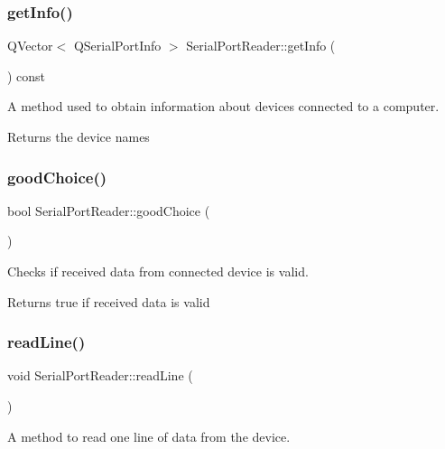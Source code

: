 \subsubsection{get\+Info()}
{\footnotesize\ttfamily Q\+Vector$<$ Q\+Serial\+Port\+Info $>$ Serial\+Port\+Reader\+::get\+Info (\begin{DoxyParamCaption}{ }\end{DoxyParamCaption}) const}



A method used to obtain information about devices connected to a computer. 

\begin{DoxyReturn}{Returns}
the device names 
\end{DoxyReturn}
\mbox{\label{class_serial_port_reader_aba5b7292f941e824467f5b1134f7f15f}} 
\subsubsection{good\+Choice()}
{\footnotesize\ttfamily bool Serial\+Port\+Reader\+::good\+Choice (\begin{DoxyParamCaption}{ }\end{DoxyParamCaption})\hspace{0.3cm}{\ttfamily [private]}}



Checks if received data from connected device is valid. 

\begin{DoxyReturn}{Returns}
true if received data is valid 
\end{DoxyReturn}
\mbox{\label{class_serial_port_reader_afb9bdbade338b204f487f2c0d4535911}} 
\subsubsection{read\+Line()}
{\footnotesize\ttfamily void Serial\+Port\+Reader\+::read\+Line (\begin{DoxyParamCaption}{ }\end{DoxyParamCaption})}



A method to read one line of data from the device. 

\mbox{\label{class_serial_port_reader_a03d89e1219ecadd67bad6a56ac6dfee2}} 
